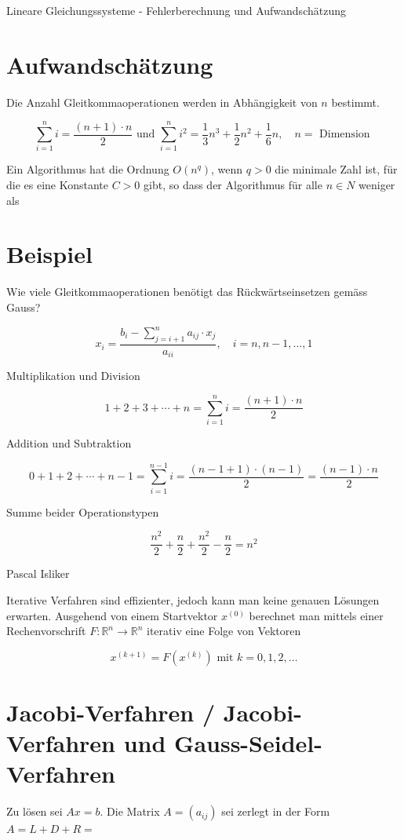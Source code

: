 \documentclass[10pt]{article}
\begin{document}
Lineare Gleichungssysteme - Fehlerberechnung und Aufwandschätzung

\section*{Aufwandschätzung}
Die Anzahl Gleitkommaoperationen werden in Abhängigkeit von $n$ bestimmt.

$$
\sum_{i=1}^{n} i=\frac{(n+1) \cdot n}{2} \text { und } \sum_{i=1}^{n} i^{2}=\frac{1}{3} n^{3}+\frac{1}{2} n^{2}+\frac{1}{6} n, \quad n=\text { Dimension }
$$

Ein Algorithmus hat die Ordnung $O\left(n^{q}\right)$, wenn $q>0$ die minimale Zahl ist, für die es eine Konstante $C>0$ gibt, so dass der Algorithmus für alle $n \in N$ weniger als

\section*{Beispiel}
Wie viele Gleitkommaoperationen benötigt das Rückwärtseinsetzen gemäss Gauss?

$$
x_{i}=\frac{b_{i}-\sum_{j=i+1}^{n} a_{i j} \cdot x_{j}}{a_{i i}}, \quad i=n, n-1, \ldots, 1
$$

Multiplikation und Division

$$
1+2+3+\cdots+n=\sum_{i=1}^{n} i=\frac{(n+1) \cdot n}{2}
$$

Addition und Subtraktion

$$
0+1+2+\cdots+n-1=\sum_{i=1}^{n-1} i=\frac{(n-1+1) \cdot(n-1)}{2}=\frac{(n-1) \cdot n}{2}
$$

Summe beider Operationstypen

$$
\frac{n^{2}}{2}+\frac{n}{2}+\frac{n^{2}}{2}-\frac{n}{2}=n^{2}
$$

Pascal Isliker

Iterative Verfahren sind effizienter, jedoch kann man keine genauen Lösungen erwarten. Ausgehend von einem Startvektor $x^{(0)}$ berechnet man mittels einer Rechenvorschrift $F: \mathbb{R}^{n} \rightarrow \mathbb{R}^{n}$ iterativ eine Folge von Vektoren

$$
x^{(k+1)}=F\left(x^{(k)}\right) \text { mit } k=0,1,2, \ldots
$$

\section*{Jacobi-Verfahren / Jacobi-Verfahren und Gauss-Seidel-Verfahren}
Zu lösen sei $A x=b$. Die Matrix $A=\left(a_{i j}\right)$ sei zerlegt in der Form $A=L+D+R=$
\end{document}
